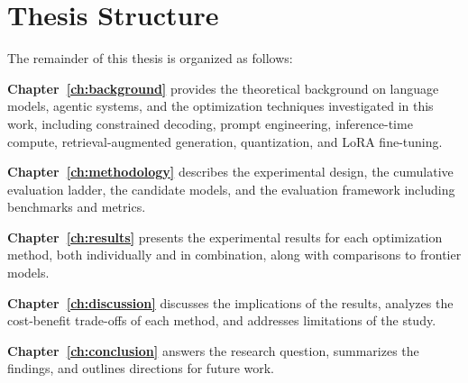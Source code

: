 \section{Thesis Structure}

The remainder of this thesis is organized as follows:

\textbf{Chapter~\ref{ch:background}} provides the theoretical background on language models, agentic systems, and the optimization techniques investigated in this work, including constrained decoding, prompt engineering, inference-time compute, retrieval-augmented generation, quantization, and LoRA fine-tuning.

\textbf{Chapter~\ref{ch:methodology}} describes the experimental design, the cumulative evaluation ladder, the candidate models, and the evaluation framework including benchmarks and metrics.

\textbf{Chapter~\ref{ch:results}} presents the experimental results for each optimization method, both individually and in combination, along with comparisons to frontier models.

\textbf{Chapter~\ref{ch:discussion}} discusses the implications of the results, analyzes the cost-benefit trade-offs of each method, and addresses limitations of the study.

\textbf{Chapter~\ref{ch:conclusion}} answers the research question, summarizes the findings, and outlines directions for future work.
